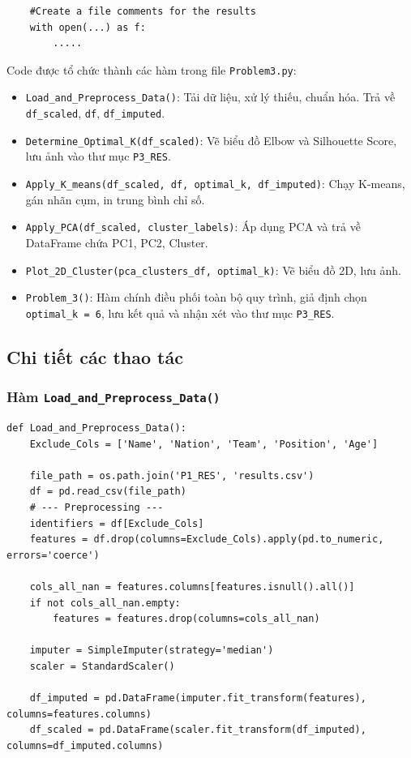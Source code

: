 \documentclass[12pt]{report}
\begin{document}
{\begin{lstlisting}
    #Create a file comments for the results
    with open(...) as f:
    	.....
\end{lstlisting}
Code được tổ chức thành các hàm trong file \texttt{Problem3.py}:

\begin{itemize}
  \item \texttt{Load\_and\_Preprocess\_Data()}: Tải dữ liệu, xử lý thiếu, chuẩn hóa. Trả về \texttt{df\_scaled}, \texttt{df}, \texttt{df\_imputed}.
  \item \texttt{Determine\_Optimal\_K(df\_scaled)}: Vẽ biểu đồ Elbow và Silhouette Score, lưu ảnh vào thư mục \texttt{P3\_RES}.
  \item \texttt{Apply\_K\_means(df\_scaled, df, optimal\_k, df\_imputed)}: Chạy K-means, gán nhãn cụm, in trung bình chỉ số.
  \item \texttt{Apply\_PCA(df\_scaled, cluster\_labels)}: Áp dụng PCA và trả về DataFrame chứa PC1, PC2, Cluster.
  \item \texttt{Plot\_2D\_Cluster(pca\_clusters\_df, optimal\_k)}: Vẽ biểu đồ 2D, lưu ảnh.
  \item \texttt{Problem\_3()}: Hàm chính điều phối toàn bộ quy trình, giả định chọn \texttt{optimal\_k = 6}, lưu kết quả và nhận xét vào thư mục \texttt{P3\_RES}.
\end{itemize}
\subsection{Chi tiết các thao tác}
\subsubsection{Hàm \texttt{Load\_and\_Preprocess\_Data()}}
\begin{lstlisting}
def Load_and_Preprocess_Data():
    Exclude_Cols = ['Name', 'Nation', 'Team', 'Position', 'Age']
    
    file_path = os.path.join('P1_RES', 'results.csv')
    df = pd.read_csv(file_path)
    # --- Preprocessing ---
    identifiers = df[Exclude_Cols]
    features = df.drop(columns=Exclude_Cols).apply(pd.to_numeric, errors='coerce')

    cols_all_nan = features.columns[features.isnull().all()]
    if not cols_all_nan.empty:
        features = features.drop(columns=cols_all_nan)

    imputer = SimpleImputer(strategy='median')
    scaler = StandardScaler()

    df_imputed = pd.DataFrame(imputer.fit_transform(features), columns=features.columns)
    df_scaled = pd.DataFrame(scaler.fit_transform(df_imputed), columns=df_imputed.columns)


\end{lstlisting}}
\end{document}
